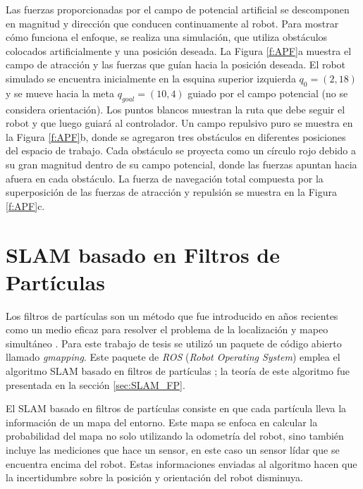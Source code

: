 Las fuerzas proporcionadas por el campo de potencial artificial se descomponen en 
magnitud y dirección que conducen continuamente al robot. Para mostrar cómo funciona el 
enfoque, se realiza una simulación, que utiliza obstáculos 
colocados artificialmente y una posición deseada. La Figura \ref{f:APF}a muestra el campo 
de atracción y las fuerzas que guían hacia la posición deseada. El robot simulado se 
encuentra inicialmente en la esquina superior izquierda $q_{0} = (2,18)$ y se mueve hacia 
la meta $q_{goal} = (10,4)$ guiado por el campo potencial (no se considera orientación). Los 
puntos blancos muestran la ruta que debe seguir el robot y que luego guiará al 
controlador. Un campo repulsivo puro se muestra en la Figura \ref{f:APF}b, donde se 
agregaron tres obstáculos en diferentes posiciones del espacio de trabajo. Cada obstáculo 
se proyecta como un círculo rojo debido a su gran magnitud dentro de su campo potencial, donde 
las fuerzas apuntan hacia afuera en cada obstáculo. La fuerza de navegación total compuesta 
por la superposición de las fuerzas de atracción y repulsión se muestra en la Figura \ref{f:APF}c.

\section{SLAM basado en Filtros de Part\'iculas}
\label{sec:GMAPPING}
Los filtros de partículas son un método que fue introducido en años recientes como un medio 
eficaz para resolver el problema de la localización y mapeo simultáneo 
\cite{nummiaro2003adaptive}. Para este trabajo de tesis se utilizó un paquete de código 
abierto llamado \textit{gmapping}. Este paquete de \textit{ROS} (\textit{Robot Operating System}) 
emplea el algoritmo SLAM basado en filtros de partículas \cite{grisetti2007improved}; la teoría
de este algoritmo fue presentada en la sección \ref{sec:SLAM_FP}.

El SLAM basado en filtros de partículas consiste en que cada partícula lleva la información de 
un mapa del entorno. Este mapa se enfoca en calcular la probabilidad del mapa no solo utilizando 
la odometría del robot, sino también incluye las mediciones que hace un sensor, en este caso un 
sensor lídar que se encuentra encima del robot. Estas informaciones enviadas al algoritmo hacen 
que la incertidumbre sobre la posición y orientación del robot disminuya. 

